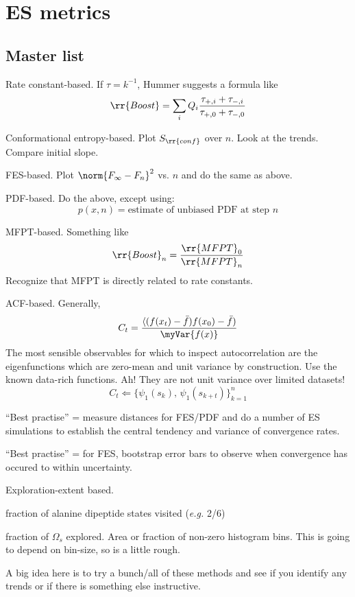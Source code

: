\section{ES metrics}
\subsection{Master list}
\begin{enumeratec}
    \item Rate constant-based.  If $\tau = k^{-1}$, Hummer suggests a formula like
    \[
        \rr{Boost} = \sum_i Q_i\frac{\tau_{+,i} + \tau_{-,i}}{\tau_{+,0} + \tau_{-,0}}
    \]
    \item Conformational entropy-based.  Plot $S_\rr{conf}$ over $n$.  Look at the trends.  Compare initial slope.
    \item FES-based.  Plot $\norm{F_\infty-F_n}^2$ vs. $n$ and do the same as above.
    \item PDF-based.  Do the above, except using:
    \[
        p(x, n) = \textrm{estimate of unbiased PDF at step }n
    \]
    \item MFPT-based.  Something like
    \[
        \rr{Boost}_n = \frac{\rr{MFPT}_0}{\rr{MFPT}_n}
    \]
    Recognize that MFPT is directly related to rate constants.
    \item ACF-based.  Generally,
    \[
        C_t = \frac{\langle(f(x_t)-\bar{f})f(x_0)-\bar{f})}{\myVar{f(x)}}
    \]
    The most sensible observables for which to inspect autocorrelation are the eigenfunctions which are zero-mean and unit variance by construction.  Use the known data-rich functions.  Ah!  They are not unit variance over limited datasets!
    \[
        C_t \Leftarrow \{\psi_1(s_k),\,\psi_1(s_{k+t})\}_{k=1}^n
    \]
    \item ``Best practise'' = measure distances for FES/PDF and do a number of ES simulations to establish the central tendency and variance of convergence rates.
    \item ``Best practise'' = for FES, bootstrap error bars to observe when convergence has occured to within uncertainty.
    \item Exploration-extent based.
    \begin{itemizec}
        \item fraction of alanine dipeptide states visited (\emph{e.g.} 2/6)
        \item fraction of $\Omega_s$ explored.  Area or fraction of non-zero histogram bins.  This is going to depend on bin-size, so is a little rough.
    \end{itemizec}
\end{enumeratec}
A big idea here is to try a bunch/all of these methods and see if you identify any trends or if there is something else instructive.

